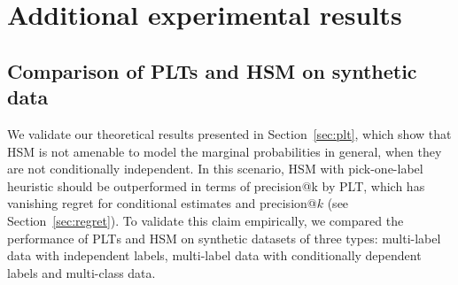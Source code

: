 \documentclass{article}
\newcommand{\Algo}[1]{\textsc{#1}}
\begin{document}
\section{Additional experimental results}

\subsection{Comparison of PLTs and HSM on synthetic data}
\label{sec:empirical-synthetic}



We validate our theoretical results presented in Section~\ref{sec:plt}, which show that  \Algo{HSM} is not amenable to model the marginal probabilities in general, when they are not conditionally independent. In this scenario, \Algo{HSM} with pick-one-label heuristic should be outperformed in terms of precision@k by \Algo{PLT}, which has vanishing regret for conditional estimates and precision@$k$ (see Section~\ref{sec:regret}). To validate this claim empirically, we compared the performance of \Algo{PLT}s and \Algo{HSM} on synthetic datasets of three types: multi-label data with independent labels, multi-label data with conditionally dependent labels and multi-class data. 
\end{document}
